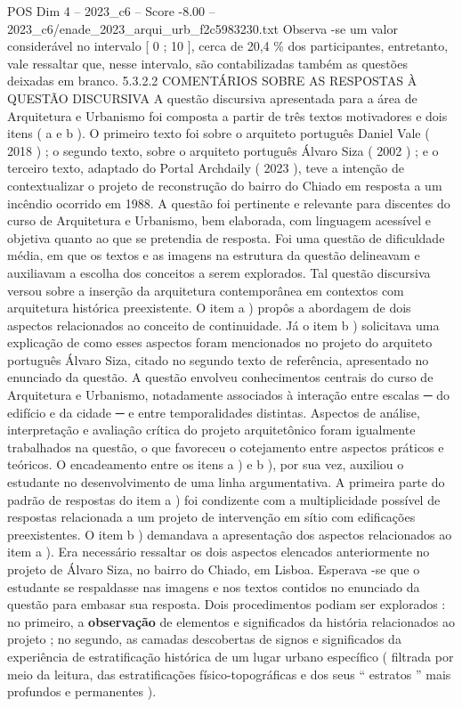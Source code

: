\begin{textsample}{POS Dim 4 – 2023\_c6 – Score -8.00 – 2023\_c6/enade\_2023\_arqui\_urb\_f2c5983230.txt}
Observa -se um valor considerável no intervalo [ 0 ; 10 ], cerca de 20,4 \% dos participantes, entretanto, vale ressaltar que, nesse intervalo, são contabilizadas também as questões deixadas em branco. 5.3.2.2 COMENTÁRIOS SOBRE AS RESPOSTAS À QUESTÃO DISCURSIVA A questão discursiva apresentada para a área de Arquitetura e Urbanismo foi composta a partir de três textos motivadores e dois itens ( a e b ).
O primeiro texto foi sobre o arquiteto português Daniel Vale ( 2018 ) ; o segundo texto, sobre o arquiteto português Álvaro Siza ( 2002 ) ; e o terceiro texto, adaptado do Portal Archdaily ( 2023 ), teve a intenção de contextualizar o projeto de reconstrução do bairro do Chiado em resposta a um incêndio ocorrido em 1988.
A questão foi pertinente e relevante para discentes do curso de Arquitetura e Urbanismo, bem elaborada, com linguagem acessível e objetiva quanto ao que se pretendia de resposta.
Foi uma questão de dificuldade média, em que os textos e as imagens na estrutura da questão delineavam e auxiliavam a escolha dos conceitos a serem explorados.
Tal questão discursiva versou sobre a inserção da arquitetura contemporânea em contextos com arquitetura histórica preexistente.
O item a ) propôs a abordagem de dois aspectos relacionados ao conceito de continuidade.
Já o item b ) solicitava uma explicação de como esses aspectos foram mencionados no projeto do arquiteto português Álvaro Siza, citado no segundo texto de referência, apresentado no enunciado da questão.
A questão envolveu conhecimentos centrais do curso de Arquitetura e Urbanismo, notadamente associados à interação entre escalas {\EmojiFont ─} do edifício e da cidade {\EmojiFont ─} e entre temporalidades distintas.
Aspectos de análise, interpretação e avaliação crítica do projeto arquitetônico foram igualmente trabalhados na questão, o que favoreceu o cotejamento entre aspectos práticos e teóricos.
O encadeamento entre os itens a ) e b ), por sua vez, auxiliou o estudante no desenvolvimento de uma linha argumentativa.
A primeira parte do padrão de respostas do item a ) foi condizente com a multiplicidade possível de respostas relacionada a um projeto de intervenção em sítio com edificações preexistentes.
O item b ) demandava a apresentação dos aspectos relacionados ao item a ).
Era necessário ressaltar os dois aspectos elencados anteriormente no projeto de Álvaro Siza, no bairro do Chiado, em Lisboa.
Esperava -se que o estudante se respaldasse nas imagens e nos textos contidos no enunciado da questão para embasar sua resposta.
Dois procedimentos podiam ser explorados : no primeiro, a \textbf{observação} de elementos e significados da história relacionados ao projeto ; no segundo, as camadas descobertas de signos e significados da experiência de estratificação histórica de um lugar urbano específico ( filtrada por meio da leitura, das estratificações físico-topográficas e dos seus “ estratos ” mais profundos e permanentes ).

\end{textsample}
